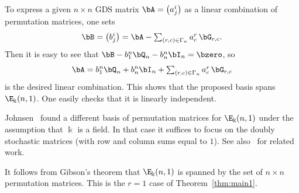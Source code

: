 To express a given $n \times n$ GDS matrix $\bA = \big(a^i_j \big)$ as
a linear combination of permutation matrices, one sets
\begin{equation}
\bB = \big(b^i_j \big) = \bA - \textstyle \sum_{(r,c) \in \Gamma_n}
a^r_c \, \bG_{r,c}.
\end{equation}
Then it is easy to see that $\bB - b^n_1 \bQ_n - b^n_n \bI_n = \bzero$, so
\begin{equation}
\bA = b^n_1 \bQ_n + b^n_n \bI_n + \textstyle \sum_{(r,c) \in \Gamma_n}
a^r_c \, \bG_{r,c}
\end{equation}
is the desired linear combination. This shows that the proposed basis
spans $\E_\Bbbk(n,1)$. One easily checks that it is linearly
independent.


Johnsen~\cite{Johnsen} found a different basis of permutation matrices
for $\E_\Bbbk(n,1)$ under the assumption that $\Bbbk$ is a field. In
that case it suffices to focus on the doubly stochastic matrices (with
row and column sums equal to $1$). See also~\cite{Lai} for related work.

\begin{rema}
 It follows from Gibson's theorem that $\E_\Bbbk(n,1)$ is spanned by
 the set of $n \times n$ permutation matrices. This is the $r=1$
 case of Theorem~\ref{thm:main1}. 
\end{rema}




